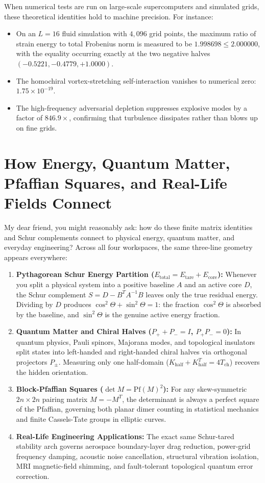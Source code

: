 \documentclass[11pt,a4paper]{article}
\theoremstyle{definition}
\begin{document}
When numerical tests are run on large-scale supercomputers and simulated grids, these theoretical identities hold to machine precision. For instance:
\begin{itemize}
    \item On an $L=16$ fluid simulation with $4,096$ grid points, the maximum ratio of strain energy to total Frobenius norm is measured to be $1.998698 \le 2.000000$, with the equality occurring exactly at the two negative halves $(-0.5221, -0.4779, +1.0000)$.
    \item The homochiral vortex-stretching self-interaction vanishes to numerical zero: $1.75 \times 10^{-19}$.
    \item The high-frequency adversarial depletion suppresses explosive modes by a factor of $846.9\times$, confirming that turbulence dissipates rather than blows up on fine grids.
\end{itemize}


\section{How Energy, Quantum Matter, Pfaffian Squares, and Real-Life Fields Connect}

My dear friend, you might reasonably ask: how do these finite matrix identities and Schur complements connect to physical energy, quantum matter, and everyday engineering? Across all four workspaces, the same three-line geometry appears everywhere:

\begin{enumerate}
  \item \textbf{Pythagorean Schur Energy Partition ($E_{\mathrm{total}} = E_{\mathrm{tare}} + E_{\mathrm{core}}$):} Whenever you split a physical system into a positive baseline $A$ and an active core $D$, the Schur complement $S = D - B^T A^{-1} B$ leaves only the true residual energy. Dividing by $D$ produces $\cos^2\Theta + \sin^2\Theta = 1$: the fraction $\cos^2\Theta$ is absorbed by the baseline, and $\sin^2\Theta$ is the genuine active energy fraction.
  \item \textbf{Quantum Matter and Chiral Halves ($P_+ + P_- = I$, $P_+ P_- = 0$):} In quantum physics, Pauli spinors, Majorana modes, and topological insulators split states into left-handed and right-handed chiral halves via orthogonal projectors $P_\pm$. Measuring only one half-domain ($K_{\mathrm{half}} + K_{\mathrm{half}}^T = 4 T_{\mathrm{ch}}$) recovers the hidden orientation.
  \item \textbf{Block-Pfaffian Squares ($\det M = \mathrm{Pf}(M)^2$):} For any skew-symmetric $2n \times 2n$ pairing matrix $M = -M^T$, the determinant is always a perfect square of the Pfaffian, governing both planar dimer counting in statistical mechanics and finite Cassels-Tate groups in elliptic curves.
  \item \textbf{Real-Life Engineering Applications:} The exact same Schur-tared stability arch governs aerospace boundary-layer drag reduction, power-grid frequency damping, acoustic noise cancellation, structural vibration isolation, MRI magnetic-field shimming, and fault-tolerant topological quantum error correction.
\end{enumerate}
\end{document}
